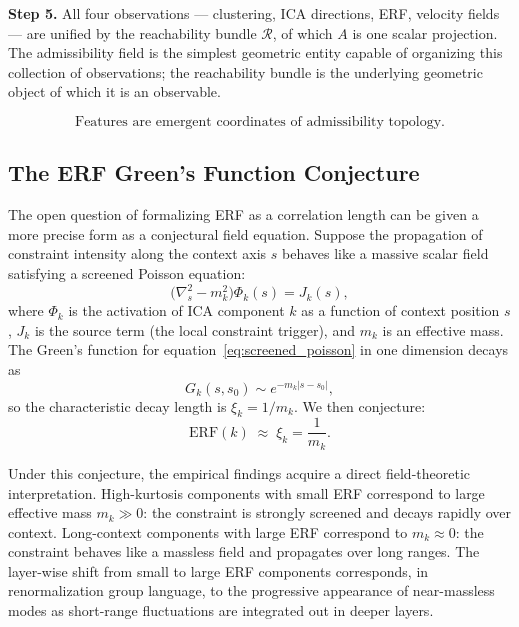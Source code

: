 \documentclass[12pt, a4paper]{article}
\theoremstyle{plain}
\theoremstyle{definition}
\theoremstyle{remark}
\newcommand{\fA}{A}
\newcommand{\ERF}{\mathrm{ERF}}
\begin{document}
\textbf{Step 5.} All four observations --- clustering, ICA directions, ERF,
velocity fields --- are unified by the reachability bundle $\mathcal{R}$, of
which $\fA$ is one scalar projection. The admissibility field is the simplest
geometric entity capable of organizing this collection of observations; the
reachability bundle is the underlying geometric object of which it is an
observable.

\begin{equation}
  \boxed{
    \text{Features are emergent coordinates of admissibility topology.}
  }
\end{equation}

\subsection{The ERF Green's Function Conjecture}

The open question of formalizing ERF as a correlation length can be given a
more precise form as a conjectural field equation. Suppose the propagation of
constraint intensity along the context axis $s$ behaves like a massive scalar
field satisfying a screened Poisson equation:
\begin{equation}
  \bigl(\nabla_s^2 - m_k^2\bigr)\Phi_k(s) = J_k(s),
  \label{eq:screened_poisson}
\end{equation}
where $\Phi_k$ is the activation of ICA component $k$ as a function of context
position $s$, $J_k$ is the source term (the local constraint trigger), and
$m_k$ is an effective mass. The Green's function for
equation~\eqref{eq:screened_poisson} in one dimension decays as
\begin{equation}
  G_k(s, s_0) \sim e^{-m_k |s - s_0|},
\end{equation}
so the characteristic decay length is $\xi_k = 1/m_k$. We then conjecture:
\begin{equation}
  \ERF(k) \;\approx\; \xi_k = \frac{1}{m_k}.
\end{equation}

Under this conjecture, the empirical findings acquire a direct field-theoretic
interpretation. High-kurtosis components with small ERF correspond to large
effective mass $m_k \gg 0$: the constraint is strongly screened and decays
rapidly over context. Long-context components with large ERF correspond to
$m_k \approx 0$: the constraint behaves like a massless field and propagates
over long ranges. The layer-wise shift from small to large ERF components
corresponds, in renormalization group language, to the progressive appearance
of near-massless modes as short-range fluctuations are integrated out in
deeper layers.
\end{document}
